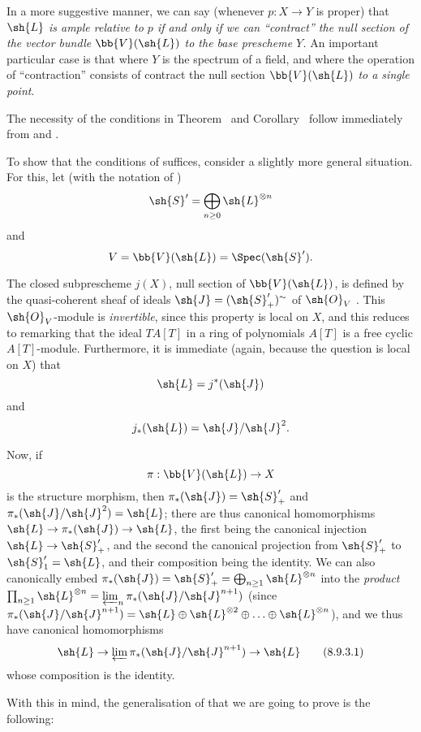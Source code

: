 In a more suggestive manner, we can say (whenever $p:X\to Y$ is proper) that \emph{$\sh{L}$ is ample relative to $p$ if and only if we can ``\emph{contract}'' the null section of the vector bundle $\bb{V}(\sh{L})$ to the base prescheme $Y$.}
An important particular case is that where $Y$ is the spectrum of a field, and where the operation of ``contraction'' consists of contract the null section $\bb{V}(\sh{L})$ \emph{to a single point}.

\begin{env}[8.9.3]
\label{II.8.9.3}
The necessity of the conditions in Theorem~ and Corollary~ follow immediately from  and .

To show that the conditions of  suffices, consider a slightly more general situation.
For this, let (with the notation of )
\[
  \sh{S}'=\bigoplus_{n\geq 0}\sh{L}^{\otimes n}
\]
and
\[
  V=\bb{V}(\sh{L})=\Spec(\sh{S}').
\]

The closed subprescheme $j(X)$, null section of $\bb{V}(\sh{L})$, is defined by the quasi-coherent sheaf of ideals $\sh{J}=(\sh{S}'_+)^\sim$ of $\sh{O}_V$ .
This $\sh{O}_V$-module is \emph{invertible}, since this property is local on $X$, and this reduces to remarking that the ideal $TA[T]$ in a ring of polynomials $A[T]$ is a free cyclic $A[T]$-module.
Furthermore, it is immediate (again, because the question is local on $X$) that
\[
  \sh{L}=j^*(\sh{J})
\]
and
\[
  j_*(\sh{L})=\sh{J}/\sh{J}^2.
\]

Now, if
\[
  \pi:\bb{V}(\sh{L})\to X
\]
is the structure morphism, then $\pi_*(\sh{J})=\sh{S}'_+$ and $\pi_*(\sh{J}/\sh{J}^2)=\sh{L}$;
there are thus canonical homomorphisms $\sh{L}\to\pi_*(\sh{J})\to\sh{L}$, the first being the canonical injection $\sh{L}\to\sh{S}'_+$, and the second the canonical projection from $\sh{S}'_+$ to $\sh{S}'_1=\sh{L}$, and their composition being the identity.
We can also canonically embed $\pi_*(\sh{J}) = \sh{S}'_+ = \bigoplus_{n\geq1}\sh{L}^{\otimes n}$ into the \emph{product} $\prod_{n\geq1}\sh{L}^{\otimes n} = \varprojlim_n \pi_*(\sh{J}/\sh{J}^{n+1})$ (since $\pi_*(\sh{J}/\sh{J}^{n+1}) = \sh{L}\oplus\sh{L}^{\otimes 2}\oplus\ldots\oplus\sh{L}^{\otimes n}$), and we thus have canonical homomorphisms
\[
\label{II.8.9.3.1}
  \sh{L}\to\varprojlim\pi_*(\sh{J}/\sh{J}^{n+1})\to\sh{L}
  \tag{8.9.3.1}
\]
whose composition is the identity.

With this in mind, the generalisation of  that we are going to prove is the following:
\end{env}

